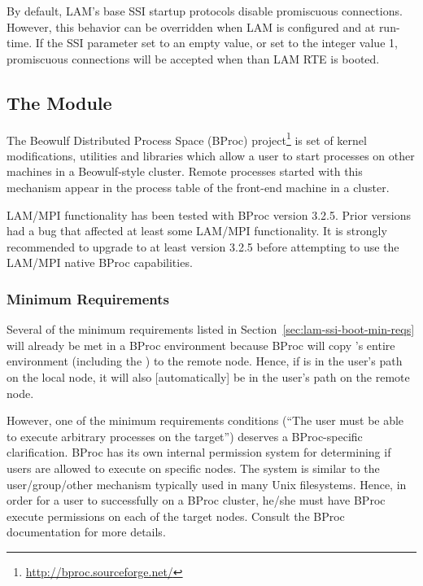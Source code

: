 By default, LAM's base  SSI startup protocols disable
promiscuous connections.  However, this behavior can be overridden
when LAM is configured and at run-time.  If the SSI parameter
 set to an empty value, or set to
the integer value 1, promiscuous connections will be accepted when
than LAM RTE is booted.


\subsection{The  Module}

The Beowulf Distributed Process Space (BProc)
project\footnote{\url{http://bproc.sourceforge.net/}} is set of kernel
modifications, utilities and libraries which allow a user to start
processes on other machines in a Beowulf-style cluster.  Remote
processes started with this mechanism appear in the process table of
the front-end machine in a cluster.

LAM/MPI functionality has been tested with BProc version 3.2.5.  Prior
versions had a bug that affected at least some LAM/MPI functionality.
It is strongly recommended to upgrade to at least version 3.2.5 before
attempting to use the LAM/MPI native BProc capabilities.


\subsubsection{Minimum Requirements}

Several of the minimum requirements listed in
Section~\ref{sec:lam-ssi-boot-min-reqs} will already be met in a BProc
environment because BProc will copy 's entire environment
(including the ) to the remote node.  Hence, if
 is in the user's path on the local node, it will also
[automatically] be in the user's path on the remote node.

However, one of the minimum requirements conditions (``The user must
be able to execute arbitrary processes on the target'') deserves a
BProc-specific clarification.  BProc has its own internal permission
system for determining if users are allowed to execute on specific
nodes.  The system is similar to the user/group/other mechanism
typically used in many Unix filesystems.  Hence, in order for a user
to successfully  on a BProc cluster, he/she must have
BProc execute permissions on each of the target nodes.  Consult the
BProc documentation for more details.

